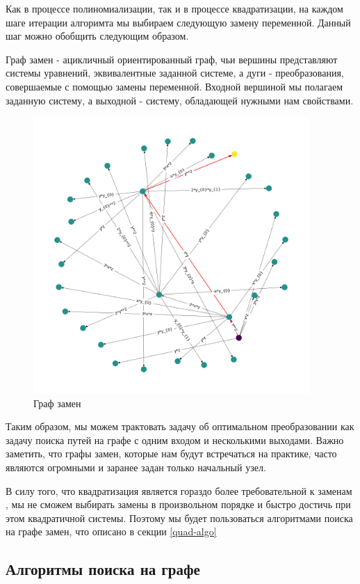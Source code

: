 Как в процессе полиномиализации, так и в процессе квадратизации, на каждом шаге итерации алгоримта мы выбираем следующую замену переменной. Данный шаг можно обобщить следующим образом.

Граф замен - ацикличный ориентированный граф, чьи вершины представляют системы уравнений, эквивалентные заданной системе, а дуги - преобразования, совершаемые с помощью замены переменной. Входной вершиной мы полагаем заданную систему, а выходной - систему, обладающей нужными нам свойствами.

\begin{figure}
\includegraphics[width=10.5cm,height=10.5cm]{chapters/images/replacement_graph.png} 
\caption{Граф замен}
\label{fig:replacement-graph}
\end{figure}

Таким образом, мы можем трактовать задачу об оптимальном преобразовании как задачу поиска путей на графе с одним входом и несколькими выходами. Важно заметить, что графы замен, которые нам будут встречаться на практике, часто являются огромными и заранее задан только начальный узел.

В силу того, что квадратизация является гораздо более требовательной к заменам \cite{Gu-PhD}, мы не сможем выбирать замены в произвольном порядке и быстро достичь при этом квадратичной системы. Поэтому мы будет пользоваться алгоритмами поиска на графе замен, что описано в секции \ref{quad-algo}

\subsection{Алгоритмы поиска на графе} \label{search-algo}

